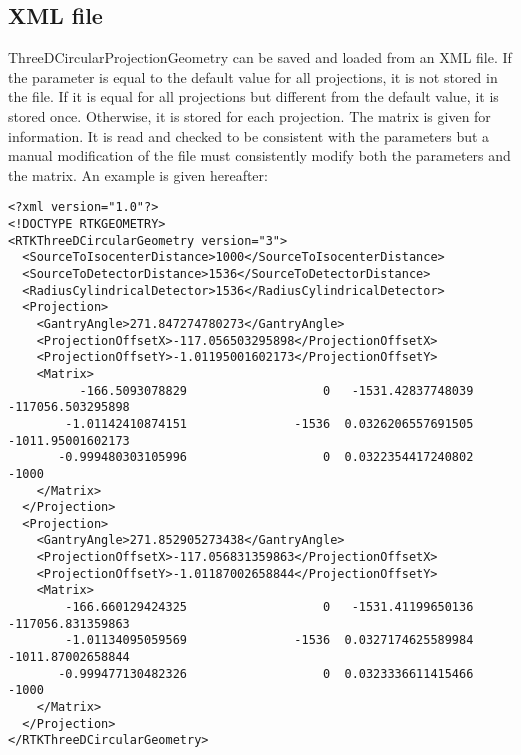 \documentclass{article}
\begin{document}
\subsection{XML file}

ThreeDCircularProjectionGeometry can be saved and loaded from an XML file. If the parameter is equal to the default value for all projections, it is not stored in the file. If it is equal for all projections but different from the default value, it is stored once. Otherwise, it is stored for each projection. The matrix is given for information. It is read and checked to be consistent with the parameters but a manual modification of the file must consistently modify both the parameters and the matrix. An example is given hereafter:

\begin{verbatim}
<?xml version="1.0"?>
<!DOCTYPE RTKGEOMETRY>
<RTKThreeDCircularGeometry version="3">
  <SourceToIsocenterDistance>1000</SourceToIsocenterDistance>
  <SourceToDetectorDistance>1536</SourceToDetectorDistance>
  <RadiusCylindricalDetector>1536</RadiusCylindricalDetector>
  <Projection>
    <GantryAngle>271.847274780273</GantryAngle>
    <ProjectionOffsetX>-117.056503295898</ProjectionOffsetX>
    <ProjectionOffsetY>-1.01195001602173</ProjectionOffsetY>
    <Matrix>
          -166.5093078829                   0   -1531.42837748039   -117056.503295898
        -1.01142410874151               -1536  0.0326206557691505   -1011.95001602173
       -0.999480303105996                   0  0.0322354417240802               -1000
    </Matrix>
  </Projection>
  <Projection>
    <GantryAngle>271.852905273438</GantryAngle>
    <ProjectionOffsetX>-117.056831359863</ProjectionOffsetX>
    <ProjectionOffsetY>-1.01187002658844</ProjectionOffsetY>
    <Matrix>
        -166.660129424325                   0   -1531.41199650136   -117056.831359863
        -1.01134095059569               -1536  0.0327174625589984   -1011.87002658844
       -0.999477130482326                   0  0.0323336611415466               -1000
    </Matrix>
  </Projection>
</RTKThreeDCircularGeometry>
\end{verbatim}
\end{document}
